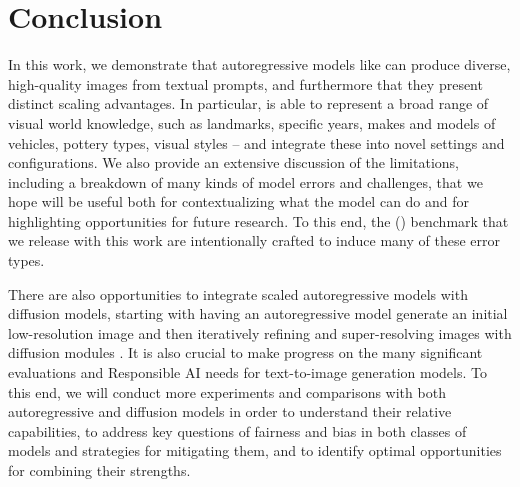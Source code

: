 \section{Conclusion}

In this work, we demonstrate that autoregressive models like \bdraw can produce diverse, high-quality images from textual prompts, and furthermore that they present distinct scaling advantages.
In particular, \bdraw is able to represent a broad range of visual world knowledge, such as landmarks, specific years, makes and models of vehicles, pottery types, visual styles -- and integrate these into novel settings and configurations. We also provide an extensive discussion of the limitations, including a breakdown of many kinds of model errors and challenges, that we hope will be useful both for contextualizing what the model can do and for highlighting opportunities for future research. To this end, the \bcp{} (\bcpa{}) benchmark that we release with this work are intentionally crafted to induce many of these error types.

There are also opportunities to integrate scaled autoregressive models with diffusion models, starting with having an autoregressive model generate an initial low-resolution image and then iteratively refining and super-resolving images with diffusion modules \cite{vqdiffusion, ramesh2022hierarchical, imagen}. It is also crucial to make progress on the many significant evaluations and Responsible AI needs for text-to-image generation models. To this end, we will conduct more experiments and comparisons with both autoregressive and diffusion models in order to understand their relative capabilities, to address key questions of fairness and bias in both classes of models and strategies for mitigating them, and to identify optimal opportunities for combining their strengths.